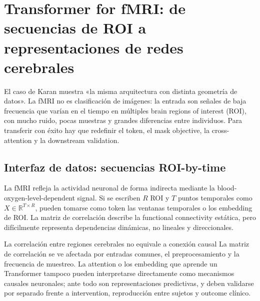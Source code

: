 \section{Transformer for fMRI: de secuencias de ROI a representaciones de redes cerebrales}

El caso de Karan muestra «la misma arquitectura con distinta geometría de datos». La fMRI no es clasificación de imágenes: la entrada son señales de baja frecuencia que varían en el tiempo en múltiples brain regions of interest (ROI), con mucho ruido, pocas muestras y grandes diferencias entre individuos. Para transferir con éxito hay que redefinir el token, el mask objective, la cross-attention y la downstream validation.

\subsection{Interfaz de datos: secuencias ROI-by-time}

La fMRI refleja la actividad neuronal de forma indirecta mediante la blood-oxygen-level-dependent signal. Si se escriben $R$ ROI y $T$ puntos temporales como $X\in\mathbb{R}^{T\times R}$, pueden tomarse como token las ventanas temporales o los embedding de ROI. La matriz de correlación describe la functional connectivity estática, pero difícilmente representa dependencias dinámicas, no lineales y direccionales.







\begin{warningbox}{La correlación entre regiones cerebrales no equivale a conexión causal}
La matriz de correlación se ve afectada por entradas comunes, el preprocesamiento y la frecuencia de muestreo. La attention o los embedding que aprende un Transformer tampoco pueden interpretarse directamente como mecanismos causales neuronales; ante todo son representaciones predictivas, y deben validarse por separado frente a intervention, reproducción entre sujetos y outcome clínico.
\end{warningbox}


